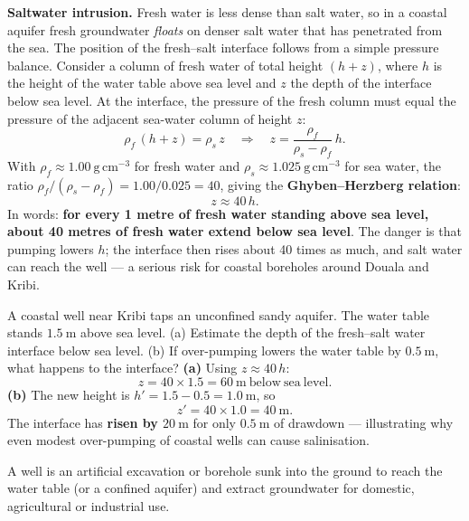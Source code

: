 \documentclass[11pt]{article}
\newcommand{\cle}[1]{{\popxbold\color{popdark}#1}}
\newcounter{popsec}
\newcounter{popsub}
\newcommand{\courssub}[1]{%
  \stepcounter{popsub}%
  \par\vspace{9pt}\noindent{\popxbold\fontsize{11.5}{13}\selectfont\color{popink}{\color{poporange}\thepopsec.\thepopsub}\hspace{6pt}#1}\par\nopagebreak\vspace{4pt}
}
\begin{document}
\textbf{Saltwater intrusion.} Fresh water is less dense than salt water, so in a coastal aquifer fresh groundwater \emph{floats} on denser salt water that has penetrated from the sea. The position of the fresh–salt interface follows from a simple pressure balance. Consider a column of fresh water of total height $(h + z)$, where $h$ is the height of the water table above sea level and $z$ the depth of the interface below sea level. At the interface, the pressure of the fresh column must equal the pressure of the adjacent sea-water column of height $z$:
\[
\rho_f\,(h+z) = \rho_s\, z
\quad\Longrightarrow\quad
z = \frac{\rho_f}{\rho_s - \rho_f}\, h .
\]
With $\rho_f \approx 1.00\ \mathrm{g\,cm^{-3}}$ for fresh water and $\rho_s \approx 1.025\ \mathrm{g\,cm^{-3}}$ for sea water, the ratio $\rho_f/(\rho_s - \rho_f) = 1.00/0.025 = 40$, giving the \textbf{Ghyben–Herzberg relation}:
\[
z \approx 40\,h .
\]
In words: \textbf{for every 1 metre of fresh water standing above sea level, about 40 metres of fresh water extend below sea level}. The danger is that pumping lowers $h$; the interface then rises about 40 times as much, and salt water can reach the well — a serious risk for coastal boreholes around Douala and Kribi.

\begin{exoresolu}
A coastal well near Kribi taps an unconfined sandy aquifer. The water table stands $1.5\ \mathrm{m}$ above sea level. (a) Estimate the depth of the fresh–salt water interface below sea level. (b) If over-pumping lowers the water table by $0.5\ \mathrm{m}$, what happens to the interface?
\tcblower
\textbf{(a)} Using $z \approx 40\,h$:
\[
z = 40 \times 1.5 = 60\ \mathrm{m\ below\ sea\ level.}
\]
\textbf{(b)} The new height is $h' = 1.5 - 0.5 = 1.0\ \mathrm{m}$, so
\[
z' = 40 \times 1.0 = 40\ \mathrm{m.}
\]
The interface has \textbf{risen by $20\ \mathrm{m}$} for only $0.5\ \mathrm{m}$ of drawdown — illustrating why even modest over-pumping of coastal wells can cause salinisation.
\end{exoresolu}

\courssub{Water Wells: Tapping the Aquifer}

\begin{definition}
A \cle{well} is an artificial excavation or borehole sunk into the ground to reach the water table (or a confined aquifer) and extract groundwater for domestic, agricultural or industrial use.
\end{definition}
\end{document}
